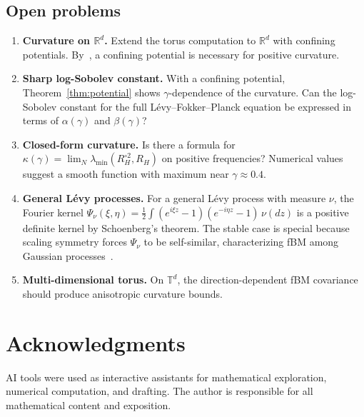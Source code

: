 \documentclass[11pt,a4paper]{article}
\theoremstyle{plain}
\theoremstyle{definition}
\theoremstyle{remark}
\newcommand{\R}{\mathbb{R}}
\newcommand{\T}{\mathbb{T}}
\begin{document}
\subsection{Open problems}

\begin{enumerate}[label=(\roman*)]
\item \textbf{Curvature on $\R^d$.}
  Extend the torus computation to $\R^d$ with confining potentials.
  By~\cite{SpenerWeberZacher2020}, a confining potential is necessary
  for positive curvature.

\item \textbf{Sharp log-Sobolev constant.}
  With a confining potential, Theorem~\ref{thm:potential} shows
  $\gamma$-dependence of the curvature. Can the log-Sobolev constant
  for the full L\'evy--Fokker--Planck equation be expressed in terms of
  $\alpha(\gamma)$ and $\beta(\gamma)$?

\item \textbf{Closed-form curvature.}
  Is there a formula for
  $\kappa(\gamma) = \lim_N \lambda_{\min}(R_H^{\circ 2}, R_H)$
  on positive frequencies? Numerical values suggest a smooth
  function with maximum near $\gamma \approx 0.4$.

\item \textbf{General L\'evy processes.}
  For a general L\'evy process with measure $\nu$, the
  Fourier kernel
  $\Psi_\nu(\xi,\eta) = \frac{1}{2}\int (e^{i\xi z}-1)(e^{-i\eta z}-1)\,
  \nu(dz)$ is a positive definite kernel by Schoenberg's theorem.
  The stable case is special because scaling symmetry forces
  $\Psi_\nu$ to be self-similar, characterizing fBM among Gaussian
  processes~\cite{Mishura2008}.

\item \textbf{Multi-dimensional torus.}
  On $\T^d$, the direction-dependent fBM covariance should produce
  anisotropic curvature bounds.
\end{enumerate}


\section*{Acknowledgments}
AI tools were used as interactive assistants for mathematical
exploration, numerical computation, and drafting. The author
is responsible for all mathematical content and exposition.
\end{document}

